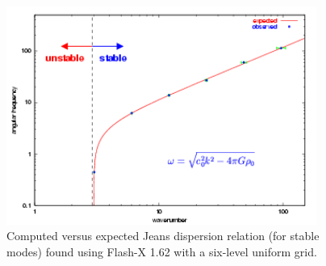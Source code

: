 \begin{figure}
\begin{center}
\includegraphics[width=4.0in]{Jeans_disp}
\caption{\label{Fig:Jeans Dispersion Plot} Computed versus expected
Jeans dispersion relation (for stable modes) found using Flash-X 1.62 with
a six-level uniform grid.}
\end{center}
\end{figure}


